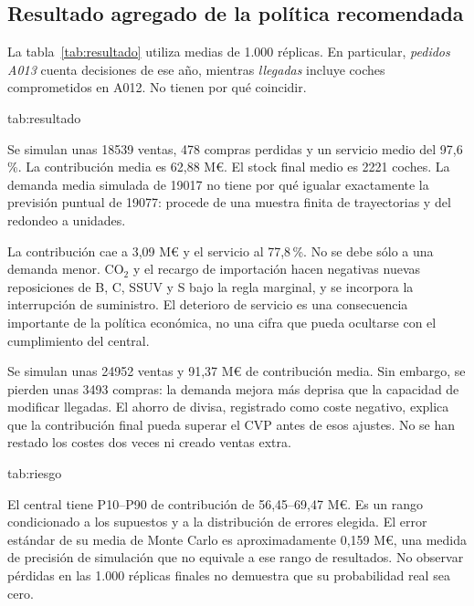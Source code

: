 \subsection{Resultado agregado de la política recomendada}
La tabla~\ref{tab:resultado} utiliza medias de 1.000 réplicas. En particular,
\emph{pedidos A013} cuenta decisiones de ese año, mientras \emph{llegadas}
incluye coches comprometidos en A012. No tienen por qué coincidir.

{tab:resultado}{}

Se simulan unas \num{18539} ventas, \num{478} compras perdidas y un servicio
medio del 97,6\,\%. La contribución media es 62,88 M\euro{}. El stock final
medio es \num{2221} coches. La demanda media simulada de \num{19017} no tiene
por qué igualar exactamente la previsión puntual de \num{19077}: procede de
una muestra finita de trayectorias y del redondeo a unidades.

La contribución cae a 3,09 M\euro{} y el servicio al 77,8\,\%. No se debe sólo
a una demanda menor. CO$_2$ y el recargo de importación hacen negativas nuevas
reposiciones de B, C, SSUV y S bajo la regla marginal, y se incorpora la
interrupción de suministro. El deterioro de servicio es una consecuencia
importante de la política económica, no una cifra que pueda ocultarse con el
cumplimiento del central.

Se simulan unas \num{24952} ventas y 91,37 M\euro{} de contribución media.
Sin embargo, se pierden unas \num{3493} compras: la demanda mejora más deprisa
que la capacidad de modificar llegadas. El ahorro de divisa, registrado como
coste negativo, explica que la contribución final pueda superar el CVP antes
de esos ajustes. No se han restado los costes dos veces ni creado ventas extra.

{tab:riesgo}{}

El central tiene P10--P90 de contribución de 56,45--69,47 M\euro{}. Es un rango
condicionado a los supuestos y a la distribución de errores elegida. El error
estándar de su media de Monte Carlo es aproximadamente 0,159 M\euro{}, una
medida de precisión de simulación que no equivale a ese rango de resultados.
No observar pérdidas en las 1.000 réplicas finales no demuestra que su
probabilidad real sea cero.

